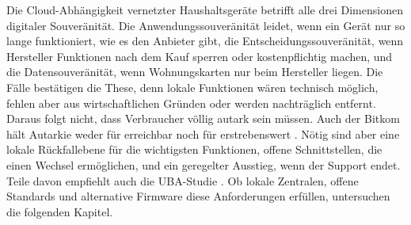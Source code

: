 Die Cloud-Abhängigkeit vernetzter Haushaltsgeräte betrifft alle drei
Dimensionen digitaler Souveränität. Die Anwendungssouveränität leidet, wenn ein Gerät nur so lange funktioniert, wie es den Anbieter gibt, die Entscheidungssouveränität, wenn Hersteller Funktionen nach dem Kauf sperren oder kostenpflichtig machen, und die Datensouveränität, wenn Wohnungskarten nur
beim Hersteller liegen. Die Fälle bestätigen die These, denn lokale Funktionen wären
technisch möglich, fehlen aber aus wirtschaftlichen Gründen oder werden
nachträglich entfernt. Daraus folgt nicht, dass Verbraucher völlig autark sein
müssen. Auch der Bitkom hält Autarkie weder für erreichbar noch für
erstrebenswert \cite[S.~7]{bitkom:2015}. Nötig sind aber eine lokale
Rückfallebene für die wichtigsten Funktionen, offene Schnittstellen, die einen
Wechsel ermöglichen, und ein geregelter Ausstieg, wenn der Support endet. Teile
davon empfiehlt auch die UBA-Studie \cite[S.~18\,f.]{jaegererben:2023}. Ob
lokale Zentralen, offene Standards und alternative Firmware diese Anforderungen
erfüllen, untersuchen die folgenden Kapitel.
